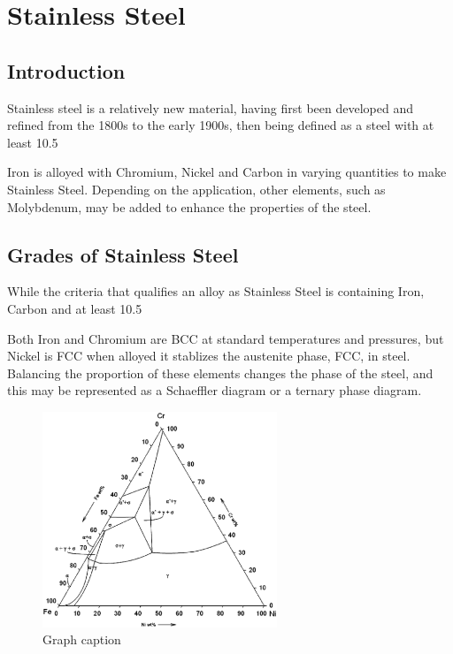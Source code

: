 \section{Stainless Steel}

\subsection{Introduction}

Stainless steel is a relatively new material, having first been developed and refined from the 1800s to the early 1900s, then being defined as a steel with at least 10.5%

Iron is alloyed with Chromium, Nickel and Carbon in varying quantities to make Stainless Steel.  Depending on the application, other elements, such as Molybdenum, may be added to enhance the properties of the steel.

\subsection{Grades of Stainless Steel}

While the criteria that qualifies an alloy as Stainless Steel is containing Iron, Carbon and at least 10.5%

Both Iron and Chromium are BCC at standard temperatures and pressures, but Nickel is FCC when alloyed it stablizes the austenite phase, FCC, in steel.  Balancing the proportion of these elements changes the phase of the steel, and this may be represented as a Schaeffler diagram or a ternary phase diagram.



\begin{figure}[tbp]
  \begin{center}
    \includegraphics[width=7.0cm]{chapters/background_austenitic_steels_in_nuclear/plots/FeCrNi}
    \caption{Graph caption}
    \label{image:flux1}
  \end{center}
\end{figure}


